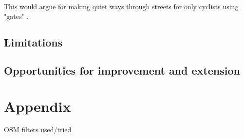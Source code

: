 \documentclass[11pt]{article} %
\begin{document}
This would argue for making quiet ways through streets for only cyclists using "gates" . 

\subsection{Limitations}



\subsection{Opportunities for improvement and extension}



\section{Appendix}

OSM filters used/tried
\end{document}
